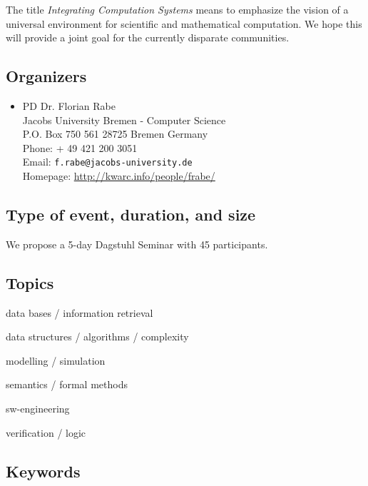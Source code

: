 \documentclass[a4paper,11pt]{article}
\begin{document}
The title \emph{Integrating Computation Systems} means to emphasize the vision of a universal environment for scientific and mathematical computation.
We hope this will provide a joint goal for the currently disparate communities.

\subsection{Organizers}

\begin{itemize}
\item PD Dr. Florian Rabe \\
Jacobs University Bremen - Computer Science\\
P.O. Box 750 561
28725 Bremen Germany
\\
Phone: + 49 421 200 3051\\
Email: \texttt{f.rabe@jacobs-university.de}  \\
Homepage: \url{http://kwarc.info/people/frabe/}
\end{itemize}

\subsection{Type of event, duration, and size}

We propose a 5-day Dagstuhl Seminar with 45 participants.

\subsection{Topics}

\begin{compactitem}
 \item data bases / information retrieval
 \item data structures / algorithms / complexity
 \item modelling / simulation
 \item semantics / formal methods
 \item sw-engineering
 \item verification / logic
\end{compactitem}

\subsection{Keywords}
\end{document}
